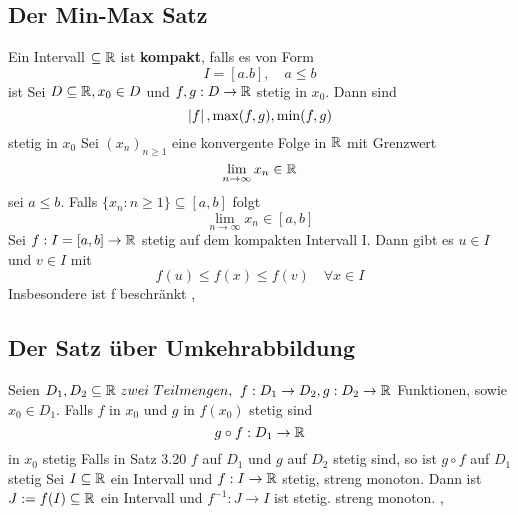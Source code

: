 \subsection{Der Min-Max Satz}
\Def[3.16] Ein Intervall \(\subseteq \mathbb{R}\) ist \textbf{kompakt}, falls es von Form
\[I = [a.b], \quad a \leq b\] ist \newline
\Lemma[3.17] Sei \(D \subseteq \mathbb{R}, x_0 \in D \) und \(f,g : D \rightarrow \mathbb{R} \) stetig in \(x_0\). Dann sind
\[ \left\lvert f \right\rvert, \max(f,g), \min(f,g) \] stetig in \(x_0\) \newline
\Lemma[3.18] Sei \((x_n)_{n \geq 1}\) eine konvergente Folge in \(\mathbb{R}\) mit Grenzwert
\[\lim\limits_{n \rightarrow \infty} x_n \in \mathbb{R} \]
sei \(a \leq b\). Falls \(\{x_n : n \geq 1\} \subseteq [a,b]\) folgt
\[\lim\limits_{n \rightarrow \infty} x_n \in [a,b] \]
\Satz[3.19] Sei \(f : I = [a,b] \rightarrow \mathbb{R} \) stetig auf dem kompakten Intervall I. Dann gibt es \(u \in I \) und \(v \in I\) mit
\[f(u) \leq f(x) \leq f(v) \quad \forall x \in I\]
Insbesondere ist f beschränkt
\sep
\subsection{Der Satz über  Umkehrabbildung} 
\Satz[3.20] Seien \(D_1, D_2 \subseteq \R \ zwei \ Teilmengen,\) \newline \(f: D_1 \rightarrow D_2, g: D_2 \rightarrow \mathbb{R}\) Funktionen, sowie \(x_0 \in D_1\). Falls \(f\) in \(x_0\) und \(g\) in \(f(x_0)\) stetig sind
\[ g \circ f : D_1 \rightarrow \mathbb{R} \]
in \(x_0\) stetig \newline
\Korollar[3.21] Falls in Satz 3.20 \(f\) auf \(D_1\) und \(g\) auf \(D_2\) stetig sind, so ist \(g \circ f\) auf \(D_1\) stetig \newline
\Satz[3.22] Sei \(I \subseteq \mathbb{R}\) ein Intervall und \(f: I \rightarrow \mathbb{R}\) stetig, streng monoton. Dann ist \(J:= f(I) \subseteq \mathbb{R}\) ein Intervall und \(f^{-1} : J \rightarrow I \) ist stetig. streng monoton.
\sep
